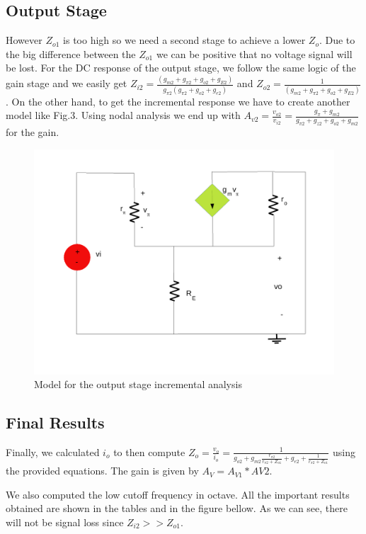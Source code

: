 \subsection{Output Stage}

However $Z_{o1}$ is too high so we need a second stage to achieve a lower $Z_{o}$. Due to the big difference between the $Z_{o1}$ we can be positive that no voltage signal will be lost.
For the DC response of the output stage, we follow the same logic of the gain stage and we easily get $Z_{i2}=\frac{(g_{m2}+g_{\pi 2}+g_{o2}+g_{E2})}{g_{\pi 2}(g_{\pi 2}+g_{o2}+g_{e2})}$ and $Z_{o2}= \frac{1}{(g_{m2}+g_{\pi2}+g_{o2}+g_{E2})}$. On the other hand, to get the incremental response we have to create another model like Fig.3. Using nodal analysis we end up with $A_{v2} = \frac{v_{o2}}{v_{i2}} = \frac{g_{\pi} + g_{m2} }{g_{\pi 2}+g_{z2}+g_{o2}+g_{m2}}$ for the gain.



\begin{figure}[h] \centering
\includegraphics[width=0.5\linewidth]{lab41.pdf}
\caption{Model for the output stage incremental analysis}
\label{s}
\end{figure}


\subsection{Final Results}


Finally, we calculated $i_o$ to then compute $Z_o=\frac{v_{o}}{i_o}=\frac{1}{g_{o2}+g_{m2}\frac{r_{\pi 2}}{r_{\pi 2}+Z_{o1}}+g_{e2}+\frac{1}{r_{\pi 2}+Z_{o1}}}$ using the provided equations. The gain is given by $A_V = A_{V1}*{AV2}$.

We also computed the low cutoff frequency in octave.
All the important results obtained are shown in the tables and in the figure bellow. As we can see, there will not be signal loss since $Z_{i2}>>Z_{o1}$.

